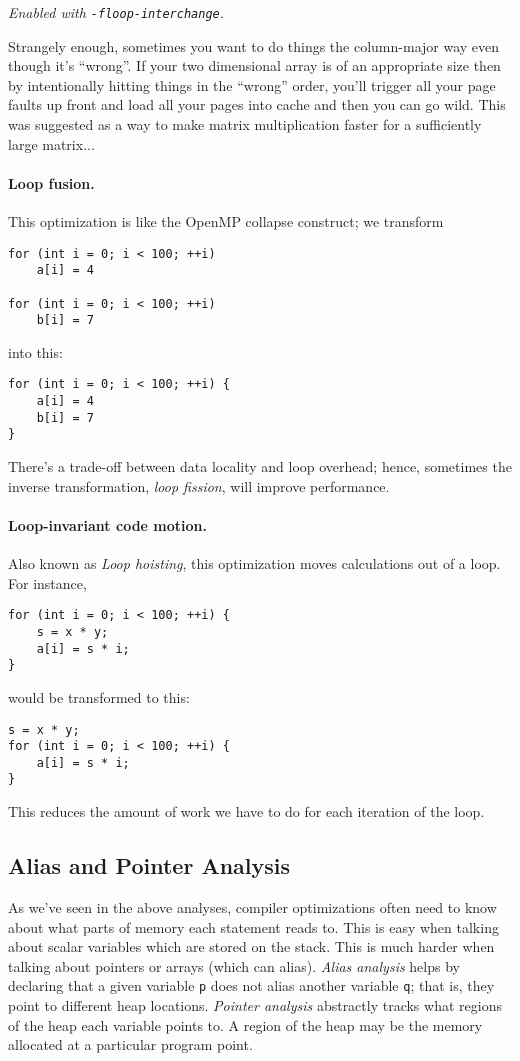 \noindent
\emph{Enabled with {\tt -floop-interchange}.}

Strangely enough, sometimes you want to do things the column-major way even though it's ``wrong''. If your two dimensional array is of an appropriate size then by intentionally hitting things in the ``wrong'' order, you'll trigger all your page faults up front and load all your pages into cache and then you can go wild. This was suggested as a way to make matrix multiplication faster for a sufficiently large matrix...

\paragraph{Loop fusion.} This optimization is like the OpenMP collapse
construct; we transform 
  \begin{verbatim}
for (int i = 0; i < 100; ++i)
    a[i] = 4

for (int i = 0; i < 100; ++i)
    b[i] = 7
  \end{verbatim}
into this:
  \begin{verbatim}
for (int i = 0; i < 100; ++i) {
    a[i] = 4
    b[i] = 7
}
  \end{verbatim}
There's a trade-off between data locality and loop overhead; hence,
sometimes the inverse transformation, \emph{loop fission}, will
improve performance.

\paragraph{Loop-invariant code motion.} Also known as \emph{Loop hoisting},
this optimization moves calculations out of a loop. For instance,
  \begin{verbatim}
for (int i = 0; i < 100; ++i) {
    s = x * y;
    a[i] = s * i;
}
  \end{verbatim}
  would be transformed to this:
  \begin{verbatim}
s = x * y;
for (int i = 0; i < 100; ++i) {
    a[i] = s * i;
}
  \end{verbatim}

This reduces the amount of work we have to do for each iteration of the loop.

\subsection*{Alias and Pointer Analysis}
As we've seen in the above analyses, compiler optimizations often need
to know about what parts of memory each statement reads to.  This is
easy when talking about scalar variables which are stored on the
stack. This is much harder when talking about pointers or arrays
(which can alias). \emph{Alias analysis} helps by declaring that a
given variable {\tt p} does not alias another variable {\tt q}; that
is, they point to different heap locations. \emph{Pointer analysis}
abstractly tracks what regions of the heap each variable points to.
A region of the heap may be the memory allocated at a particular
program point.

